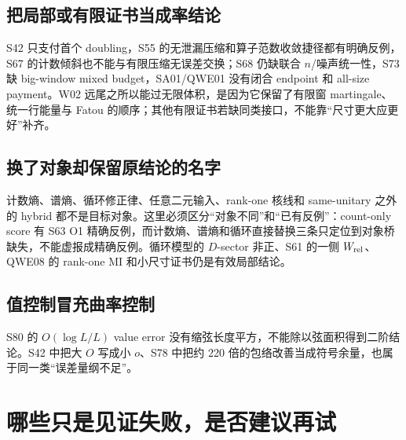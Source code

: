 \documentclass[UTF8,11pt]{ctexart}
\begin{document}
\subsection{把局部或有限证书当成率结论}

S42 只支付首个 doubling，S55 的无泄漏压缩和算子范数收敛捷径都有明确反例，S67 的计数倾斜也不能与有限压缩无误差交换；S68 仍缺联合 $n$/噪声统一性，S73 缺 big-window mixed budget，SA01/QWE01 没有闭合 endpoint 和 all-size payment。W02 远尾之所以能过无限体积，是因为它保留了有限窗 martingale、统一行能量与 Fatou 的顺序；其他有限证书若缺同类接口，不能靠“尺寸更大应更好”补齐。

\subsection{换了对象却保留原结论的名字}

计数熵、谱熵、循环修正律、任意二元输入、rank-one 核线和 same-unitary 之外的 hybrid 都不是目标对象。这里必须区分“对象不同”和“已有反例”：count-only score 有 S63 O1 精确反例，而计数熵、谱熵和循环直接替换三条只定位到对象桥缺失，不能虚报成精确反例。循环模型的 $D$-sector 非正、S61 的一侧 $W_{\rm rel}$、QWE08 的 rank-one MI 和小尺寸证书仍是有效局部结论。

\subsection{值控制冒充曲率控制}

S80 的 $O(\log L/L)$ value error 没有缩弦长度平方，不能除以弦面积得到二阶结论。S42 中把大 $O$ 写成小 $o$、S78 中把约 220 倍的包络改善当成符号余量，也属于同一类“误差量纲不足”。

\section{哪些只是见证失败，是否建议再试}
\end{document}
